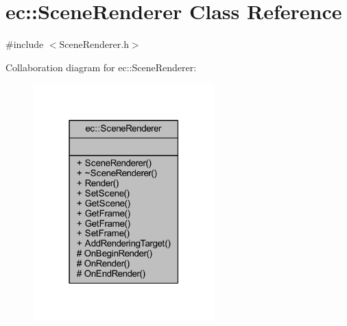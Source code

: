 \hypertarget{classec_1_1_scene_renderer}{}\section{ec\+:\+:Scene\+Renderer Class Reference}
\label{classec_1_1_scene_renderer}


{\ttfamily \#include $<$Scene\+Renderer.\+h$>$}



Collaboration diagram for ec\+:\+:Scene\+Renderer\+:
\nopagebreak
\begin{figure}[H]
\begin{center}
\leavevmode
\includegraphics[width=199pt]{classec_1_1_scene_renderer__coll__graph}
\end{center}
\end{figure}
